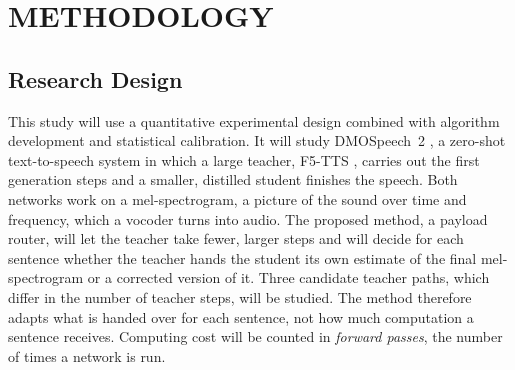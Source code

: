 
\section{METHODOLOGY}
\label{sec:method}


\subsection{Research Design}
\label{sec:design}

This study will use a quantitative experimental design combined with algorithm development and statistical calibration. It will study DMOSpeech~2 \parencite{li2025dmospeech2}, a zero-shot text-to-speech system in which a large teacher, F5-TTS \parencite{chen2024f5}, carries out the first generation steps and a smaller, distilled student finishes the speech. Both networks work on a mel-spectrogram, a picture of the sound over time and frequency, which a vocoder turns into audio. The proposed method, a payload router, will let the teacher take fewer, larger steps and will decide for each sentence whether the teacher hands the student its own estimate of the final mel-spectrogram or a corrected version of it. Three candidate teacher paths, which differ in the number of teacher steps, will be studied. The method therefore adapts what is handed over for each sentence, not how much computation a sentence receives. Computing cost will be counted in \emph{forward passes}, the number of times a network is run.

